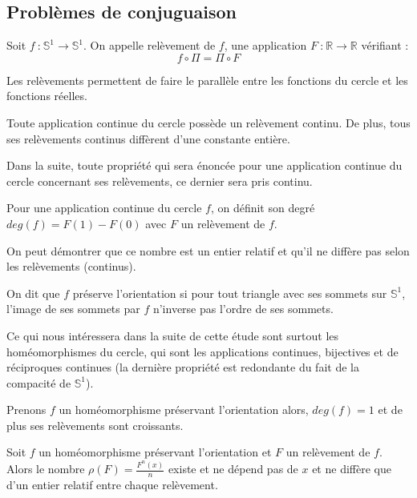 \documentclass[11pt,a4paper]{article}
\begin{document}
\subsection{Problèmes de conjuguaison}
\begin{defin}
Soit $f \ \text{:} \ \mathbb{S}^1 \to \mathbb{S}^1$. On appelle relèvement de $f$, une application $F \ \text{:} \ \mathbb{R} \to \mathbb{R}$ vérifiant :
\begin{equation*}
f \circ \Pi = \Pi \circ F
\end{equation*}
\end{defin}
\begin{rmq}
Les relèvements permettent de faire le parallèle entre les fonctions du cercle et les fonctions réelles.
\end{rmq}
\begin{thm}
Toute application continue du cercle possède un relèvement continu. De plus, tous ses relèvements continus diffèrent d'une constante entière.
\end{thm}
Dans la suite, toute propriété qui sera énoncée pour une application continue du cercle concernant ses relèvements, ce dernier sera pris continu.
\begin{defin}
Pour une application continue du cercle $f$, on définit son degré $deg(f)= F(1)-F(0)$ avec $F$ un relèvement de $f$.
\end{defin}
\begin{rmq}
On peut démontrer que ce nombre est un entier relatif et qu'il ne diffère pas selon les relèvements (continus).
\end{rmq}
\begin{defin}
On dit que $f$ préserve l'orientation si pour tout triangle avec ses sommets sur $\mathbb{S}^1$, l'image de ses sommets par $f$ n'inverse pas l'ordre de ses sommets.
\end{defin}
Ce qui nous intéressera dans la suite de cette étude sont surtout les homéomorphismes du cercle, qui sont les applications continues, bijectives et de réciproques continues (la dernière propriété est redondante du fait de la compacité de $\mathbb{S}^1$).

\begin{prop}
Prenons $f$ un homéomorphisme préservant l'orientation alors, $deg(f)=1$ et de plus ses relèvements sont croissants.
\end{prop}

\begin{prop}
Soit $f$ un homéomorphisme préservant l'orientation et $F$ un relèvement de $f$. Alors le nombre $\rho (F)= \frac{F^n(x)}{n}$ existe et ne dépend pas de $x$ et ne diffère que d'un entier relatif entre chaque relèvement.
\end{prop}
\end{document}
